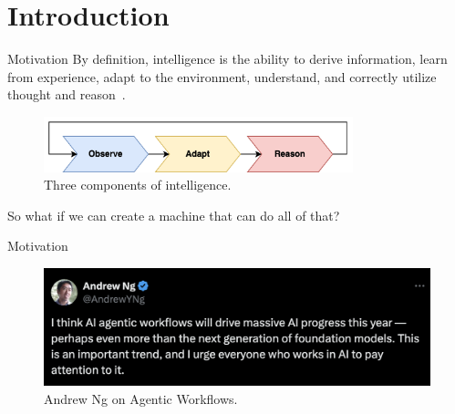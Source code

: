 \section{Introduction}

\begin{frame}{Motivation}
    By definition, intelligence is the ability to derive information, learn from experience, adapt to the environment, understand, and correctly utilize thought and reason~\cite{chollet2019measure}.\\
    \vspace{0.5cm}
    \begin{figure}[!htb]
        \centering
        \includegraphics[width=0.8\textwidth]{img/intelligence}
        \captionsetup{font=small,labelformat=empty}
        \caption{Three components of intelligence.}
    \end{figure}
    So what if we can create a machine that can do all of that?
\end{frame}

\begin{frame}{Motivation}
    \begin{figure}[!htb]
        \centering
        \includegraphics[width=1.0\textwidth]{img/agentic_workflow}
        \captionsetup{font=small,labelformat=empty}
        \caption{Andrew Ng on Agentic Workflows.\footnotemark[1]}
    \end{figure}
\end{frame}
